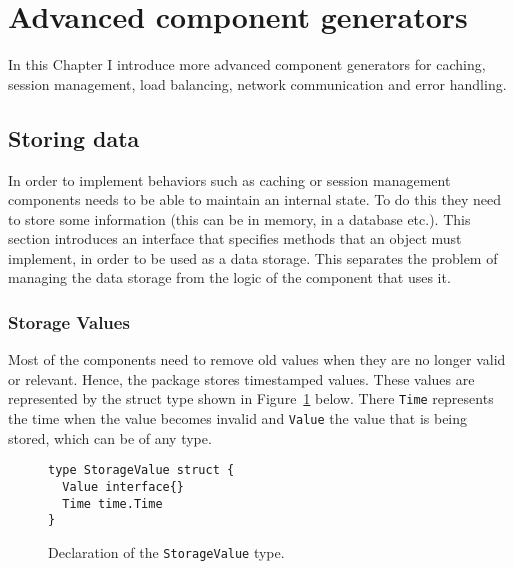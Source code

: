 \section{Advanced component generators}
\label{sec:impl2}
In this Chapter I introduce more advanced component generators for caching,
session management, load balancing, network communication and error handling.

\subsection{Storing data}
In order to implement behaviors such as caching or session management
components needs to be able to maintain an internal state.
To do this they need to store some information (this can be in memory, 
in a database etc.).
This section introduces an interface that specifies methods that an 
object must implement, in order to be used as a data storage. This 
separates the problem of managing the data storage from the logic of
the component that uses it.

\subsubsection{Storage Values}
Most of the components need to remove old values when they are no longer
valid or relevant. Hence, the package stores timestamped values. 
These values are represented by the struct type shown in 
Figure~\ref{fig:StorageValue} below. There \texttt{Time} represents the time 
when the value becomes invalid and \texttt{Value} the value that is being
stored, which can be of any type.
\begin{figure}[h]
\centering
\begin{lstlisting}
type StorageValue struct {
  Value interface{}
  Time time.Time
}
\end{lstlisting}
\caption[scale=1.0]{Declaration of the \texttt{StorageValue} type.}
\label{fig:StorageValue}
\end{figure}


